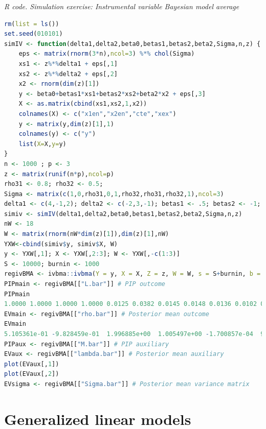 \begin{tcolorbox}[enhanced,width=4.67in,center upper,
	fontupper=\large\bfseries,drop shadow southwest,sharp corners]
	\textit{R code. Simulation exercise: Instrumental variable Bayesian model average}
	\begin{VF}
		\begin{lstlisting}[language=R]
rm(list = ls())
set.seed(010101)
simIV <- function(delta1,delta2,beta0,betas1,betas2,beta2,Sigma,n,z) {
	eps <- matrix(rnorm(3*n),ncol=3) %*% chol(Sigma)
	xs1 <- z%*%delta1 + eps[,1]
	xs2 <- z%*%delta2 + eps[,2]
	x2 <- rnorm(dim(z)[1])
	y <- beta0+betas1*xs1+betas2*xs2+beta2*x2 + eps[,3]
	X <- as.matrix(cbind(xs1,xs2,1,x2)) 
	colnames(X) <- c("x1en","x2en","cte","xex")
	y <- matrix(y,dim(z)[1],1)
	colnames(y) <- c("y")
	list(X=X,y=y)
}
n <- 1000 ; p <- 3 
z <- matrix(runif(n*p),ncol=p)
rho31 <- 0.8; rho32 <- 0.5;
Sigma <- matrix(c(1,0,rho31,0,1,rho32,rho31,rho32,1),ncol=3)
delta1 <- c(4,-1,2); delta2 <- c(-2,3,-1); betas1 <- .5; betas2 <- -1; beta2 <- 1; beta0 <- 2
simiv <- simIV(delta1,delta2,beta0,betas1,betas2,beta2,Sigma,n,z)
nW <- 18
W <- matrix(rnorm(nW*dim(z)[1]),dim(z)[1],nW)
YXW<-cbind(simiv$y, simiv$X, W)
y <- YXW[,1]; X <- YXW[,2:3]; W <- YXW[,-c(1:3)]
S <- 10000; burnin <- 1000
regivBMA <- ivbma::ivbma(Y = y, X = X, Z = z, W = W, s = S+burnin, b = burnin, odens = S, print.every = round(S/10), run.diagnostics = FALSE)
PIPmain <- regivBMA[["L.bar"]] # PIP outcome
PIPmain
1.0000 1.0000 1.0000 1.0000 0.0125 0.0382 0.0145 0.0148 0.0136 0.0102 0.0070 0.0527 0.0014 0.0077 0.0211 0.0081 0.0047 0.0141 0.0028 0.0063 0.0072 0.0220
EVmain <- regivBMA[["rho.bar"]] # Posterior mean outcome
EVmain
5.105361e-01 -9.828459e-01  1.996885e+00  1.005497e+00 -1.700857e-04  9.946613e-04  1.086717e-04 -1.448951e-04  1.532812e-04  1.356334e-04 -6.027285e-05  9.119699e-04 -1.581408e-05  1.050517e-04 2.488002e-04 -6.229493e-05  4.292825e-05  3.371366e-05  5.345760e-06  5.933764e-05 5.066236e-05 1.516718e-04
PIPaux <- regivBMA[["M.bar"]] # PIP auxiliary
EVaux <- regivBMA[["lambda.bar"]] # Posterior mean auxiliary
plot(EVaux[,1])
plot(EVaux[,2])
EVsigma <- regivBMA[["Sigma.bar"]] # Posterior mean variance matrix
\end{lstlisting}
\end{VF}
\end{tcolorbox} 
     


\section{Generalized linear models}\label{sec10_3}

